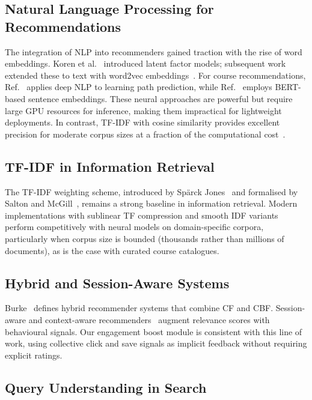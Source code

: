 \documentclass[12pt, a4paper]{article}
\begin{document}
\subsection{Natural Language Processing for Recommendations}

The integration of NLP into recommenders gained traction with the rise of word embeddings.
Koren et al.~\cite{koren2009matrix} introduced latent factor models; subsequent work extended these
to text with word2vec embeddings~\cite{mikolov2013distributed}. For course recommendations,
Ref.~\cite{zhang2019deep} applies deep NLP to learning path prediction, while
Ref.~\cite{deng2020mooc} employs BERT-based sentence embeddings. These neural approaches are
powerful but require large GPU resources for inference, making them impractical for lightweight
deployments. In contrast, TF-IDF with cosine similarity provides excellent precision for moderate
corpus sizes at a fraction of the computational cost~\cite{manning2008introduction}.

\subsection{TF-IDF in Information Retrieval}

The TF-IDF weighting scheme, introduced by Sp\"{a}rck Jones~\cite{sparckjones1972statistical} and
formalised by Salton and McGill~\cite{salton1983introduction}, remains a strong baseline in
information retrieval. Modern implementations with sublinear TF compression and smooth IDF variants
\cite{manning2008introduction} perform competitively with neural models on domain-specific corpora,
particularly when corpus size is bounded (thousands rather than millions of documents), as is the
case with curated course catalogues.

\subsection{Hybrid and Session-Aware Systems}

Burke~\cite{burke2002hybrid} defines hybrid recommender systems that combine CF and CBF.
Session-aware and context-aware recommenders~\cite{adomavicius2005toward} augment relevance
scores with behavioural signals. Our engagement boost module is consistent with this line of work,
using collective click and save signals as implicit feedback without requiring explicit ratings.

\subsection{Query Understanding in Search}
\end{document}
